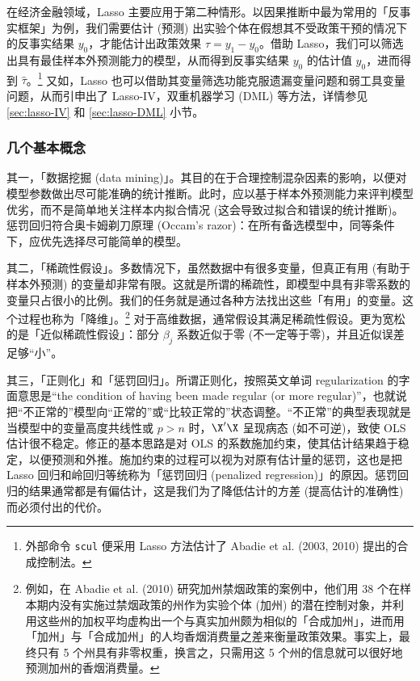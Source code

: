 在经济金融领域，Lasso 主要应用于第二种情形。以因果推断中最为常用的「反事实框架」为例，我们需要估计 (预测) 出实验个体在假想其不受政策干预的情况下的反事实结果 $y_0$，才能估计出政策效果 $\tau = y_1 - y_0$。借助 Lasso，我们可以筛选出具有最佳样本外预测能力的模型，从而得到反事实结果 $y_0$ 的估计值 $\widehat{y}_0$，进而得到 $\widehat{\tau}$。\footnote{%
      外部命令 \texttt{scul} 便采用 Lasso 方法估计了 Abadie et al. (2003, 2010) 提出的合成控制法。}
又如，Lasso 也可以借助其变量筛选功能克服遗漏变量问题和弱工具变量问题，从而引申出了 Lasso-IV，双重机器学习 (DML) 等方法，详情参见 \ref{sec:lasso-IV} 和 \ref{sec:lasso-DML} 小节。 

\subsubsection{几个基本概念}

其一，「数据挖掘 (data mining)」。其目的在于合理控制混杂因素的影响，以便对模型参数做出尽可能准确的统计推断。此时，应以基于样本外预测能力来评判模型优劣，而不是简单地关注样本内拟合情况 (这会导致过拟合和错误的统计推断)。惩罚回归符合奥卡姆剃刀原理 (Occam's razor)：在所有备选模型中，同等条件下，应优先选择尽可能简单的模型。

其二，「稀疏性假设」。多数情况下，虽然数据中有很多变量，但真正有用 (有助于样本外预测) 的变量却非常有限。这就是所谓的稀疏性，即模型中具有非零系数的变量只占很小的比例。我们的任务就是通过各种方法找出这些「有用」的变量。这个过程也称为「降维」。\footnote{%
      例如，在 Abadie et al. (2010) 研究加州禁烟政策的案例中，他们用 38 个在样本期内没有实施过禁烟政策的州作为实验个体 (加州) 的潜在控制对象，并利用这些州的加权平均虚构出一个与真实加州颇为相似的「合成加州」，进而用「加州」与「合成加州」的人均香烟消费量之差来衡量政策效果。事实上，最终只有 5 个州具有非零权重，换言之，只需用这 5 个州的信息就可以很好地预测加州的香烟消费量。}
对于高维数据，通常假设其满足稀疏性假设。更为宽松的是「近似稀疏性假设\label{page:稀疏性假设}」：部分 $\beta_{j}$ 系数近似于零 (不一定等于零)，并且近似误差足够“小”。



其三，「正则化」和「惩罚回归」。所谓正则化，按照英文单词 regularization 的字面意思是“the condition of having been made regular (or more regular)”，也就说把“不正常的”模型向“正常的”或“比较正常的”状态调整。“不正常”的典型表现就是当模型中的变量高度共线性或 $p>n$ 时，$\X'\X$ 呈现病态 (如不可逆)，致使 OLS 估计很不稳定。修正的基本思路是对 OLS 的系数施加约束，使其估计结果趋于稳定，以便预测和外推。施加约束的过程可以视为对原有估计量的惩罚，这也是把 Lasso 回归和岭回归等统称为「惩罚回归 (penalized regression)」的原因。惩罚回归的结果通常都是有偏估计，这是我们为了降低估计的方差 (提高估计的准确性) 而必须付出的代价。  

